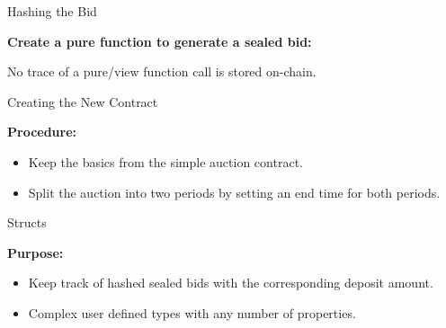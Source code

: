\documentclass[handout]{beamer}
\begin{document}
\begin{frame}{Hashing the Bid}

	\textbf{Create a pure function to generate a sealed bid:}
	
	
	
	No trace of a pure/view function call is stored on-chain.\\
	
\end{frame}

\begin{frame}[allowframebreaks]{Creating the New Contract}

	\textbf{Procedure:}
	
	\begin{itemize}
		\item Keep the basics from the simple auction contract.
		\item Split the auction into two periods by setting an end time for both periods.	
	\end{itemize}
	
	

\end{frame}

\begin{frame}{Structs}

	\textbf{Purpose:}
	
	\begin{itemize}
		\item Keep track of hashed sealed bids with the corresponding deposit amount.
		\item Complex user defined types with any number of properties.
	\end{itemize}
	
	
	
	
\end{frame}
\end{document}
